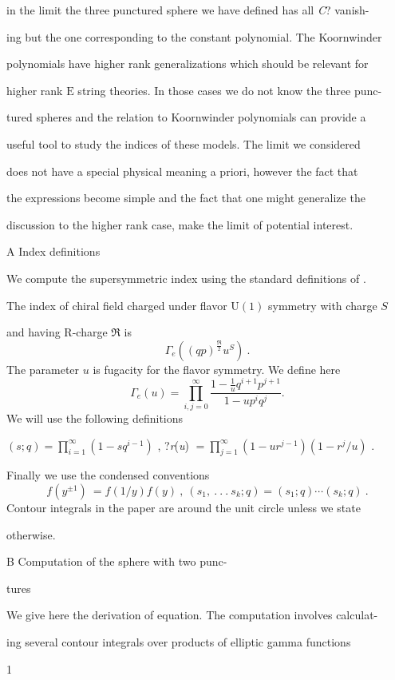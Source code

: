 \documentclass[a4paper,12pt]{article}
\begin{document}
in the limit the three punctured sphere we have defined has all {\it C}? vanish-

ing but the one corresponding to the constant polynomial. The Koornwinder

polynomials have higher rank generalizations which should be relevant for

higher rank $\mathrm{E}$ string theories. In those cases we do not know the three punc-

tured spheres and the relation to Koornwinder polynomials can provide a

useful tool to study the indices of these models. The limit we considered

does not have a special physical meaning a priori, however the fact that

the expressions become simple and the fact that one might generalize the

discussion to the higher rank case, make the limit of potential interest.

A Index definitions

We compute the supersymmetric index using the standard definitions of .

The index of chiral field charged under flavor $\mathrm{U}(1)$ symmetry with charge $S$

and having $\mathrm{R}$-charge $\mathfrak{R}$ is
$$
\Gamma_{e}((qp)^{\frac{\mathfrak{R}}{2}}u^{S})\ .
$$
The parameter $u$ is fugacity for the flavor symmetry. We define here
$$
\Gamma_{e}(u)=\prod_{i,j=0}^{\infty}\frac{1-\frac{1}{u}q^{i+1}p^{j+1}}{1-up^{i}q^{j}}.
$$
We will use the following definitions

$(s;q)=\displaystyle \prod_{i=1}^{\infty}(1-sq^{i-1})$ , ?{\it r}({\it u}) $=\displaystyle \prod_{j=1}^{\infty}(1-ur^{j-1})(1-r^{j}/u)$ .

Finally we use the condensed conventions
$$
f(y^{\pm 1})\ =f(1/y)f(y)\ ,\ (s_{1},\ .\ .\ .\ s_{k};q)=(s_{1};q)\cdots(s_{k};q)\ .
$$
Contour integrals in the paper are around the unit circle unless we state

otherwise.

B Computation of the sphere with two punc-

tures

We give here the derivation of equation. The computation involves calculat-

ing several contour integrals over products of elliptic gamma functions

1
\end{document}
